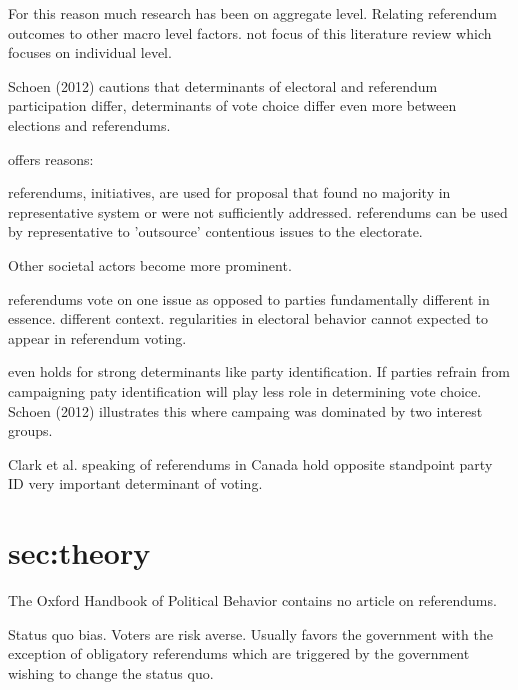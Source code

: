 \documentclass[11pt,a4paper]{article}
\begin{document}
	For this reason much research has been on aggregate level. Relating referendum outcomes to other macro level factors. not focus of this literature review which focuses on individual level.
	
	Schoen (2012) cautions that determinants of electoral and referendum participation differ, determinants of vote choice differ even more between elections and referendums. 
	
	offers reasons:
	

referendums, initiatives, are used for proposal that found no majority in representative system or were not sufficiently addressed. referendums can be used by representative to 'outsource' contentious issues to the electorate. 

Other societal actors become more prominent. 

referendums vote on one issue as opposed to parties fundamentally different in essence. different context. regularities in electoral behavior cannot expected to appear in referendum voting.

even holds for strong determinants like party identification. If parties refrain from campaigning paty identification will play less role in determining vote choice. Schoen (2012) illustrates this where campaing was dominated by two interest groups.

Clark et al. speaking of referendums in Canada hold opposite standpoint party ID very important determinant of voting.



\section{sec:theory}

The Oxford Handbook of Political Behavior contains no article on referendums.

Status quo bias. Voters are risk averse. Usually favors the government with the exception of obligatory referendums which are triggered by the government wishing to change the status quo.
\end{document}
